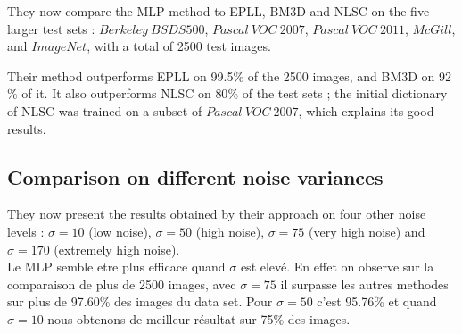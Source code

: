 \documentclass[10pt,a4paper]{article}
\newcommand{\svs}{\vspace{9pt}}
\begin{document}
\svs

They now compare the MLP method to EPLL, BM3D and NLSC on the five larger test sets : $Berkeley\ BSDS500$, $Pascal\ VOC\ 2007$, $Pascal\ VOC\ 2011$, $McGill$, and $ImageNet$, with a total of 2500 test images.

\svs

Their method outperforms EPLL on 99.5$\%$ of the 2500 images, and BM3D on 92$\%$ of it. It also outperforms NLSC on 80$\%$ of the test sets ; the initial dictionary of NLSC was trained on a subset of $Pascal\ VOC\ 2007$, which explains its good results.

\subsection{Comparison on different noise variances}

They now present the results obtained by their approach on four other
noise levels : $\sigma = 10$ (low noise), $\sigma = 50$
(high noise), $\sigma = 75$ (very high noise) and $\sigma = 170$ (extremely high noise). \\
Le MLP semble etre plus efficace quand $\sigma$ est elevé. En effet on observe sur la comparaison de plus de 2500 images, avec $\sigma = 75$ il surpasse les autres methodes sur plus de 97.60\% des images du data set. Pour $\sigma = 50$ c'est 95.76\% et quand $\sigma = 10$ nous obtenons de meilleur résultat sur 75\% des images.


\printbibliography
\end{document}
